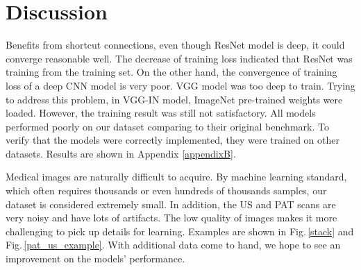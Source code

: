 \section{Discussion}
Benefits from shortcut connections, even though ResNet model is deep, it could converge reasonable well. The decrease of training loss indicated that ResNet was training from the training set. On the other hand, the convergence of training loss of a deep CNN model is very poor. VGG model was too deep to train. Trying to address this problem, in VGG-IN model, ImageNet pre-trained weights were loaded. However, the training result was still not satisfactory. All models performed poorly on our dataset comparing to their original benchmark. To verify that the models were correctly implemented, they were trained on other datasets. Results are shown in Appendix \ref{appendixB}. 

Medical images are naturally difficult to acquire. By machine learning standard, which often requires thousands or even hundreds of thousands samples, our dataset is considered extremely small. In addition, the US and PAT scans are very noisy and have lots of artifacts. The low quality of images makes it more challenging to pick up details for learning. Examples are shown in Fig.\,\ref{stack} and Fig.\,\ref{pat_us_example}. With additional data come to hand, we hope to see an improvement on the models' performance.